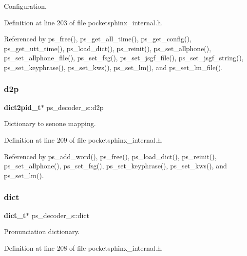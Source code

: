 Configuration. 



Definition at line 203 of file pocketsphinx\+\_\+internal.\+h.



Referenced by ps\+\_\+free(), ps\+\_\+get\+\_\+all\+\_\+time(), ps\+\_\+get\+\_\+config(), ps\+\_\+get\+\_\+utt\+\_\+time(), ps\+\_\+load\+\_\+dict(), ps\+\_\+reinit(), ps\+\_\+set\+\_\+allphone(), ps\+\_\+set\+\_\+allphone\+\_\+file(), ps\+\_\+set\+\_\+fsg(), ps\+\_\+set\+\_\+jsgf\+\_\+file(), ps\+\_\+set\+\_\+jsgf\+\_\+string(), ps\+\_\+set\+\_\+keyphrase(), ps\+\_\+set\+\_\+kws(), ps\+\_\+set\+\_\+lm(), and ps\+\_\+set\+\_\+lm\+\_\+file().

\mbox{\label{structps__decoder__s_ae6515cbc261686f3f3bbd95719f79793}} 
\subsubsection{d2p}
{\footnotesize\ttfamily \textbf{ dict2pid\+\_\+t}$\ast$ ps\+\_\+decoder\+\_\+s\+::d2p}



Dictionary to senone mapping. 



Definition at line 209 of file pocketsphinx\+\_\+internal.\+h.



Referenced by ps\+\_\+add\+\_\+word(), ps\+\_\+free(), ps\+\_\+load\+\_\+dict(), ps\+\_\+reinit(), ps\+\_\+set\+\_\+allphone(), ps\+\_\+set\+\_\+fsg(), ps\+\_\+set\+\_\+keyphrase(), ps\+\_\+set\+\_\+kws(), and ps\+\_\+set\+\_\+lm().

\mbox{\label{structps__decoder__s_aef6228c17907cc1d0cef835b238b5d91}} 
\subsubsection{dict}
{\footnotesize\ttfamily \textbf{ dict\+\_\+t}$\ast$ ps\+\_\+decoder\+\_\+s\+::dict}



Pronunciation dictionary. 



Definition at line 208 of file pocketsphinx\+\_\+internal.\+h.



